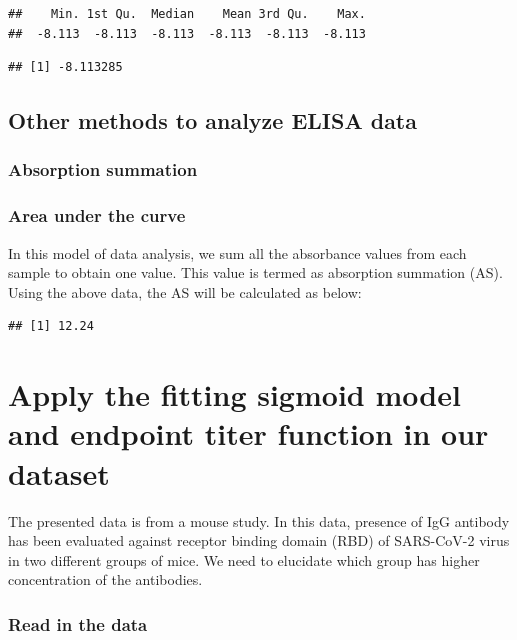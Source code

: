 \documentclass[
]{book}
\begin{document}
\begin{verbatim}
##    Min. 1st Qu.  Median    Mean 3rd Qu.    Max. 
##  -8.113  -8.113  -8.113  -8.113  -8.113  -8.113
\end{verbatim}

\begin{verbatim}
## [1] -8.113285
\end{verbatim}

\subsection{Other methods to analyze ELISA data}\label{other-methods-to-analyze-elisa-data}

\subsubsection{Absorption summation}\label{absorption-summation}

\subsubsection{Area under the curve}\label{area-under-the-curve}

In this model of data analysis, we sum all the absorbance values from each sample to obtain one value. This value is termed as absorption summation (AS). Using the above data, the AS will be calculated as below:

\begin{verbatim}
## [1] 12.24
\end{verbatim}

\section{Apply the fitting sigmoid model and endpoint titer function in our dataset}\label{apply-the-fitting-sigmoid-model-and-endpoint-titer-function-in-our-dataset}

The presented data is from a mouse study. In this data, presence of IgG antibody has been evaluated against receptor binding domain (RBD) of SARS-CoV-2 virus in two different groups of mice. We need to elucidate which group has higher concentration of the antibodies.

\subsubsection{Read in the data}\label{read-in-the-data-1}
\end{document}
